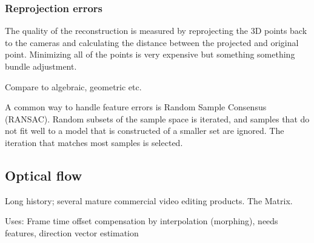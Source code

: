 \subsubsection{Reprojection errors}

The quality of the reconstruction is measured by reprojecting the 3D points back to the cameras and calculating the distance between the projected and original point.
Minimizing all of the points is very expensive but something something bundle adjustment.

Compare to algebraic, geometric etc.

A common way to handle feature errors is Random Sample Consensus (RANSAC). Random subsets of the sample space is iterated, and samples that do not fit well to a model that is constructed of a smaller set are ignored. The iteration that matches most samples is selected.

\subsection{Optical flow}

Long history; several mature commercial video editing products. The Matrix.

Uses: Frame time offset compensation by interpolation (morphing), needs features, direction vector estimation

